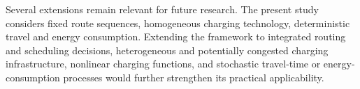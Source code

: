 \documentclass[3p,11pt,authoryear]{elsarticle}  %
\begin{document}
Several extensions remain relevant for future research. The present study considers fixed route sequences, homogeneous charging technology, deterministic travel and energy consumption. Extending the framework to integrated routing and scheduling decisions, heterogeneous and potentially congested charging infrastructure, nonlinear charging functions, and stochastic travel-time or energy-consumption processes would further strengthen its practical applicability. 

\end{document}
